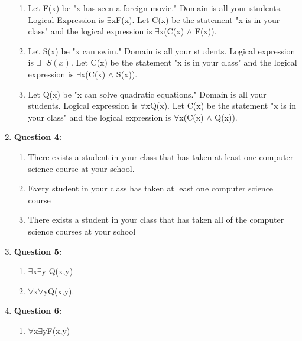 \documentclass[11pt]{article}
\begin{document}
\begin{enumerate}
\begin{enumerate}[label=(\alph*)]
\item{Let F(x) be "x has seen a foreign movie." Domain is all your students. Logical Expression is $\exists$xF(x). Let C(x) be the statement "x is in your class" and the logical expression is $\exists$x(C(x) $\wedge$ F(x)).}

\item{Let S(x) be "x can swim." Domain is all your students. Logical expression is $\exists \neg S(x)$. Let C(x) be the statement "x is in your class" and the logical expression is $\exists$x(C(x) $\wedge$ \neg S(x)).}

\item{Let Q(x) be "x can solve quadratic equations." Domain is all your students. Logical expression is $\forall$xQ(x). Let C(x) be the statement "x is in your class" and the logical expression is $\forall$x(C(x) $\wedge$ Q(x)).}

\end{enumerate}

\item
\textbf{Question 4:}
\begin{enumerate}[label=(\alph*)]

\item{There exists a student in your class that has taken at least one computer science course at your school.}

\item{Every student in your class has taken at least one computer science course}

\item{There exists a student in your class that has taken all of the computer science courses at your school}

\end {enumerate}

\item
\textbf{Question 5:}
\begin{enumerate}[label=(\alph*)]

\item{$\exists$x$\exists$y Q(x,y)}

\item{$\forall$x$\forall$y\neg Q(x,y).}

\end{enumerate}

\item
\textbf{Question 6:}
\begin{enumerate}[label=(\alph*)]

\item{$\forall$x$\exists$yF(x,y)}


\end{enumerate}
\end{enumerate}
\end{document}
